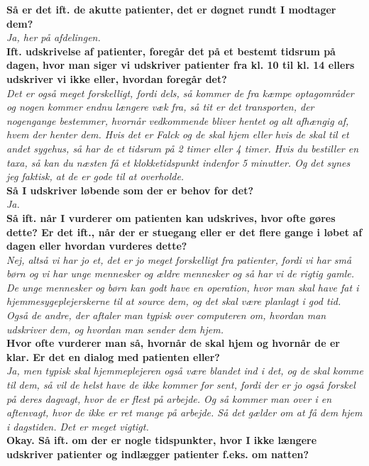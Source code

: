 \noindent
\textbf{Så er det ift. de akutte patienter, det er døgnet rundt I modtager dem?}\\
\noindent
\textit{Ja, her på afdelingen.}\\
\noindent
\textbf{Ift. udskrivelse af patienter, foregår det på et bestemt tidsrum på dagen, hvor man siger vi udskriver patienter fra kl. 10 til kl. 14 ellers udskriver vi ikke eller, hvordan foregår det?}\\
\noindent
\textit{Det er også meget forskelligt, fordi dels, så kommer de fra kæmpe optagområder og nogen kommer endnu længere væk fra, så tit er det transporten, der nogengange bestemmer, hvornår vedkommende bliver hentet og alt afhængig af, hvem der henter dem. Hvis det er Falck og de skal hjem eller hvis de skal til et andet sygehus, så har de et tidsrum på 2 timer eller 4 timer. Hvis du bestiller en taxa, så kan du næsten få et klokketidspunkt indenfor 5 minutter. Og det synes jeg faktisk, at de er gode til at overholde.}\\ 
\noindent
\textbf{Så I udskriver løbende som der er behov for det?}\\
\noindent
\textit{Ja.}\\
\noindent
\textbf{Så ift. når I vurderer om patienten kan udskrives, hvor ofte gøres dette? Er det ift., når der er stuegang eller er det flere gange i løbet af dagen eller hvordan vurderes dette?}\\
\noindent
\textit{Nej, altså vi har jo et, det er jo meget forskelligt fra patienter, fordi vi har små børn og vi har unge mennesker og ældre mennesker og så har vi de rigtig gamle. De unge mennesker og børn kan godt have en operation, hvor man skal have fat i hjemmesygeplejerskerne til at source dem, og det skal være planlagt i god tid. Også de andre, der aftaler man typisk over computeren om, hvordan man udskriver dem, og hvordan man sender dem hjem.}\\
\noindent
\textbf{Hvor ofte vurderer man så, hvornår de skal hjem og hvornår de er klar. Er det en dialog med patienten eller?}\\
\noindent
\textit{Ja, men typisk skal hjemmeplejeren også være blandet ind i det, og de skal komme til dem, så vil de helst have de ikke kommer for sent, fordi der er jo også forskel på deres dagvagt, hvor de er flest på arbejde. Og så kommer man over i en aftenvagt, hvor de ikke er ret mange på arbejde. Så det gælder om at få dem hjem i dagstiden. Det er meget vigtigt.}\\
\noindent
\textbf{Okay. Så ift. om der er nogle tidspunkter, hvor I ikke længere udskriver patienter og indlægger patienter f.eks. om natten?}\\
